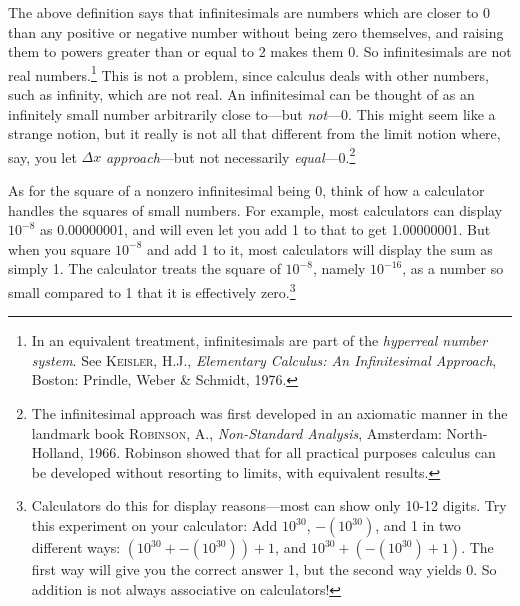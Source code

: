 
The above definition says that infinitesimals are numbers which are closer to 0
than any positive or negative number without being zero themselves, and
raising them to powers greater than or equal to 2 makes them 0. So infinitesimals
are not real numbers.\footnote{In an equivalent treatment, infinitesimals are
part of the \emph{hyperreal number system}. See \textsc{Keisler, H.J.},
\emph{Elementary Calculus: An Infinitesimal Approach}, Boston: Prindle, Weber
\& Schmidt, 1976.} This is not a problem, since calculus deals
with other numbers, such as infinity, which are not real. An infinitesimal can
be thought of as an infinitely small number arbitrarily close to---but
\emph{not}---0.
\newpage
This might seem like a strange notion, but it really is not all that
different from the limit notion where, say, you let $\Delta x$
\emph{approach}---but not necessarily \emph{equal}---0.\footnote{The
infinitesimal approach was first developed in an
axiomatic manner in the landmark book \textsc{Robinson, A.},
\emph{Non-Standard Analysis}, Amsterdam: North-Holland, 1966. Robinson showed
that for all practical purposes calculus can be developed without resorting to
limits, with equivalent results.}

As for the square of a nonzero infinitesimal being 0, think of how a calculator
handles the squares of small numbers. For example, most calculators can display
$10^{-8}$ as 0.00000001, and will even let you add 1 to that to get
1.00000001. But when you square $10^{-8}$ and add 1 to it, most calculators will
display the sum as simply 1. The calculator treats the square of $10^{-8}$,
namely $10^{-16}$, as a number so small compared to 1 that it is
effectively zero.\footnote{Calculators do this for display reasons---most
can show only 10-12 digits. Try this experiment on your
calculator: Add $10^{30}$, $-\left(10^{30}\right)$, and 1 in two different
ways: $\left(10^{30} + -\left(10^{30}\right)\right) + 1$, and $10^{30} +
\left(-\left(10^{30}\right) + 1\right)$. The first way will give you the correct
answer 1, but the second way yields 0.
So addition is not always associative on calculators!}

